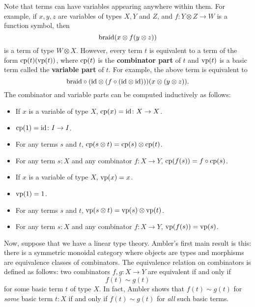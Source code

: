 \documentclass[12pt]{article}
\newcommand{\maps}{\colon}
\newcommand{\tensor}{\otimes}
\newcommand{\Id}{{\rm id}}
\newcommand{\braid}{{\rm braid}}
\newcommand{\cp}{{\rm cp}}
\newcommand{\vp}{{\rm vp}}
\begin{document}
Note that terms can have variables appearing anywhere within them.
For example, if $x,y,z$ are variables of types $X,Y$ and $Z$, and
$f\maps Y \tensor Z \to W$ is a function symbol, then
\[ \braid(x \tensor f(y \tensor z)) \]
is a term of type $W \tensor X$.  However, every term $t$ is
equivalent to a term of the form $\cp(t)(\vp(t))$, where $\cp(t)$
is the {\bf combinator part} of $t$ and $\vp(t)$ is a basic term
called the {\bf variable part} of $t$.  For example, the above term is
equivalent to
\[ \braid \circ (\Id \tensor (f \circ (\Id \tensor \Id)))
(x \tensor (y \tensor z)). \]
The combinator and variable parts can be computed inductively as follows:
\begin{itemize}
  \item If $x$ is a variable of type $X$, $\cp(x) = \Id\maps X \to X$.
  \item $\cp(1) = \Id\maps I \to I$.
  \item For any terms $s$ and $t$, $\cp(s \tensor t) = \cp(s) \tensor \cp(t)$.
  \item For any term $s:X$ and any combinator $f : X \to Y$, 
$\cp(f(s)) = f \circ \cp(s)$. \\
  \item If $x$ is a variable of type $X$, $\vp(x) = x$.
  \item $\vp(1) = 1$.
  \item For any terms $s$ and $t$, $\vp(s \tensor t) = \vp(s) \tensor \vp(t)$.
  \item For any term $s:X$ and any combinator $f \maps X \to Y$, 
$\vp(f(s)) = \vp(s)$.
\end{itemize}

Now, suppose that we have a linear type theory.  Ambler's first main
result is this: there is a symmetric monoidal category where objects
are types and morphisms are equivalence classes of
combinators.  The equivalence relation on combinators is defined as
follows: two combinators $f, g \maps X \to Y$ are equivalent if and
only if
\[                    f(t) \sim g(t)  \]
for some basic term $t$ of type $X$.  In fact, Ambler shows that
$f(t) \sim g(t)$ for {\it some} basic term $t:X$ if and only if 
$f(t) \sim g(t)$ for {\it all} such basic terms.
\end{document}
